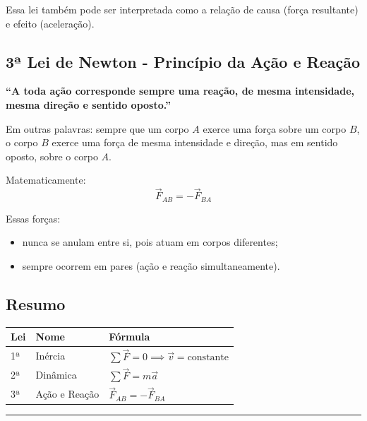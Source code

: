 \documentclass[a4paper,12pt]{article}
\begin{document}
Essa lei também pode ser interpretada como a relação de causa (força resultante) e efeito (aceleração).

\subsection*{3ª Lei de Newton - Princípio da Ação e Reação}

\textbf{``A toda ação corresponde sempre uma reação, de mesma intensidade, mesma direção e sentido oposto.''}

Em outras palavras: sempre que um corpo \( A \) exerce uma força sobre um corpo \( B \), o corpo \( B \) exerce uma força de mesma intensidade e direção, mas em sentido oposto, sobre o corpo \( A \).

Matematicamente:
\[
\vec{F}_{AB} = -\vec{F}_{BA}
\]

Essas forças:
\begin{itemize}
    \item nunca se anulam entre si, pois atuam em corpos diferentes;
    \item sempre ocorrem em pares (ação e reação simultaneamente).
\end{itemize}

\subsection*{Resumo}

\begin{center}
\begin{tabular}{lll}
\toprule
\textbf{Lei} & \textbf{Nome} & \textbf{Fórmula} \\
\midrule
1ª & Inércia & \( \sum \vec{F} = 0 \implies \vec{v} = \text{constante} \) \\
2ª & Dinâmica & \( \sum \vec{F} = m \vec{a} \) \\
3ª & Ação e Reação & \( \vec{F}_{AB} = -\vec{F}_{BA} \) \\
\bottomrule
\end{tabular}
\end{center}

\noindent\rule{\linewidth}{0.6pt}\\
\end{document}
